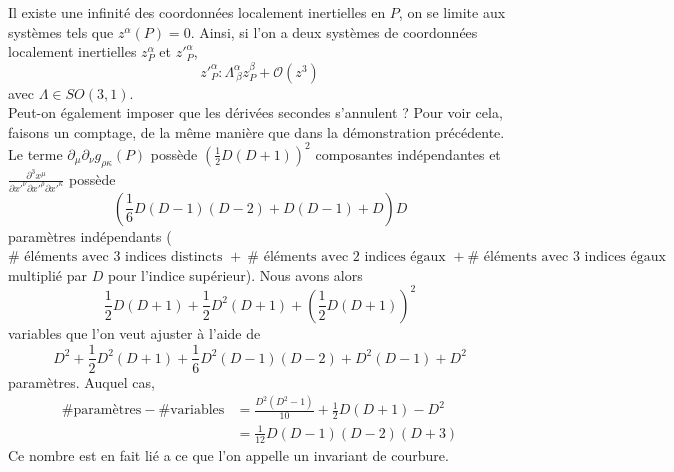 \documentclass[a4paper,11pt]{report}
\theoremstyle{definition}
\theoremstyle{plain}
\theoremstyle{definition}
\theoremstyle{remark}
\newcommand{\p}{\partial}
\begin{document}
            Il existe une infinité des coordonnées localement inertielles en $P$, on se limite aux systèmes tels que $z^\alpha(P) = 0$. Ainsi, si l'on a deux systèmes de coordonnées localement inertielles $z^\alpha_P$ et $z'^\alpha_P$, 
            \begin{equation}
                z'^\alpha_P : \Lambda^\alpha_{~\beta}z^\beta_P+\mathcal{O}(z^3)
            \end{equation}
            avec $\Lambda\in SO(3,1)$.\\
            
            Peut-on également imposer que les dérivées secondes s'annulent ? Pour voir cela, faisons un comptage, de la même manière que dans la démonstration précédente. Le terme $\p_\mu\p_\nu g_{\rho\kappa}(P)$ possède $\left(\frac{1}{2}D(D+1)\right)^2$ composantes indépendantes et $\frac{\p^3 x^\mu}{\p x'^\nu\p x'^\rho\p x'^\kappa}$ possède
            \begin{equation}
                \left(\frac{1}{6}D(D-1)(D-2)+D(D-1)+D\right)D
            \end{equation} paramètres indépendants ($\#\text{ éléments avec 3 indices distincts }+~\#\text{ éléments avec 2 indices égaux }+\#\text{ éléments avec 3 indices égaux}$ multiplié par $D$ pour l'indice supérieur). Nous avons alors
            \begin{equation}
                \frac{1}{2}D(D+1)+\frac{1}{2}D^2(D+1)+\left(\frac{1}{2}D(D+1)\right)^2
            \end{equation}
            variables que l'on veut ajuster à l'aide de
            \begin{equation}
                D^2+\frac{1}{2}D^2(D+1)+\frac{1}{6}D^2(D-1)(D-2)+D^2(D-1)+D^2
            \end{equation}
            paramètres. Auquel cas,
            \begin{align}
                \#\text{paramètres}-\#\text{variables} &= \frac{D^2(D^2-1)}{10}+\frac{1}{2}D(D+1)-D^2\\
                &= \frac{1}{12}D(D-1)(D-2)(D+3)
            \end{align}
            Ce nombre est en fait lié a ce que l'on appelle un invariant de courbure.
            
\end{document}
